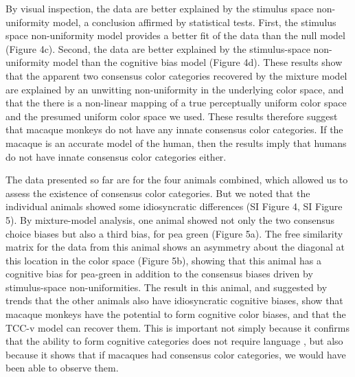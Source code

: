 By visual inspection, the data are better explained by the stimulus space non-uniformity model, a conclusion affirmed by statistical tests. First, the stimulus space non-uniformity model provides a better fit of the data than the null model (Figure 4c). Second, the data are better explained by the stimulus-space non-uniformity model than the cognitive bias model (Figure 4d). These results show that the apparent two consensus color categories recovered by the mixture model are explained by an unwitting non-uniformity in the underlying color space, and that the there is a non-linear mapping of a true perceptually uniform color space and the presumed uniform color space we used. These results therefore suggest that macaque monkeys do not have any innate consensus color categories. If the macaque is an accurate model of the human, then the results imply that humans do not have innate consensus color categories either. 

The data presented so far are for the four animals combined, which allowed us to assess the existence of consensus color categories. But we noted that the individual animals showed some idiosyncratic differences (SI Figure 4, SI Figure 5).
By mixture-model analysis, one animal showed not only the two consensus choice biases but also a third bias, for pea green (Figure 5a). The free similarity matrix for the data from this animal shows an asymmetry about the diagonal at this location in the color space (Figure 5b), showing that this animal has a cognitive bias for pea-green in addition to the consensus biases driven by stimulus-space non-uniformities. The result in this animal, and suggested by trends that the other animals also have idiosyncratic cognitive biases, show that macaque monkeys have the potential to form cognitive color biases, and that the TCC-v model can recover them. This is important not simply because it confirms that the ability to form cognitive categories does not require language \citep{panichello_error-correcting_2019}, but also because it shows that if macaques had consensus color categories, we would have been able to observe them.


